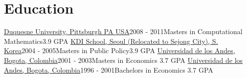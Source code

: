 \section{Education}
\resumeSubHeadingListStart
\resumeSubheading
{\href{https://www.duq.edu/}{Duquesne University, Pittsburgh PA USA}}{2008 - 2011}{Masters in Computational Mathematics}{3.9 GPA}
\resumeSubheading
{\href{https://www.kdischool.ac.kr/}{KDI School, Seoul (Relocated to Sejong City), S. Korea}}{2004 - 2005}{Masters in Public Policy}{3.9 GPA}
\resumeSubheading
{\href{https://uniandes.edu.co/}{Universidad de los Andes, Bogota, Colombia}}{2001 - 2003}{Masters in Economics }{3.7 GPA}
\resumeSubheading
{\href{https://uniandes.edu.co/}{Universidad de los Andes, Bogota, Colombia}}{1996 - 2001}{Bachelors in Economics }{3.7 GPA}
\resumeSubHeadingListEnd
\vspace{-15pt}

